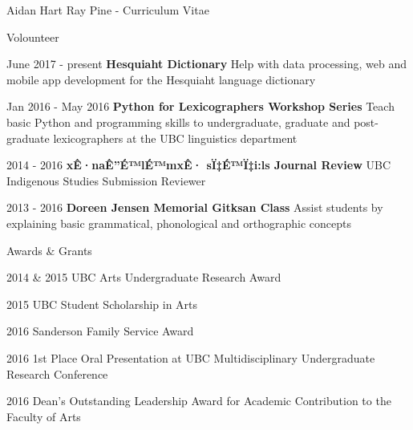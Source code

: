 \documentclass[12pt]{letter}
\begin{document}
\begin{cv}{ Aidan Hart Ray Pine  \space - \space   Curriculum Vitae}
        \begin{cvlist}{Volounteer}
                            \item[June 2017 - present] \textbf{Hesquiaht Dictionary}
                \newline Help with data processing, web and mobile app development for the Hesquiaht language dictionary
                            \item[Jan 2016 - May 2016] \textbf{Python for Lexicographers Workshop Series}
                \newline Teach basic Python and programming skills to undergraduate, graduate and post-graduate lexicographers at the UBC linguistics department
                            \item[2014 - 2016] \textbf{xÊ·naÊ”É™lÉ™mxÊ· sÏ‡É™Ï‡i:ls Journal Review}
                \newline UBC Indigenous Studies Submission Reviewer
                            \item[2013 - 2016] \textbf{Doreen Jensen Memorial Gitksan Class}
                \newline Assist students by explaining basic grammatical, phonological and orthographic concepts
                    \end{cvlist}

        \begin{cvlist}{Awards \& Grants}
                        \item[2014 \& 2015] UBC Arts Undergraduate Research Award
                        \item[2015] UBC Student Scholarship in Arts
                        \item[2016] Sanderson Family Service Award
                        \item[2016] 1st Place Oral Presentation at UBC Multidisciplinary Undergraduate Research Conference
                        \item[2016] Dean's Outstanding Leadership Award for Academic Contribution to the Faculty of Arts
                    \end{cvlist}

    \end{cv}
    
    
\end{document}
